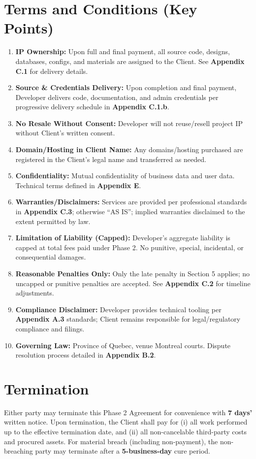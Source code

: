 \documentclass[11pt, a4paper]{article}
\begin{document}
\section{Terms and Conditions (Key Points)}
\begin{enumerate}[label=\textbf{8.\arabic*}, leftmargin=*, wide, labelwidth=!, labelindent=0pt]
  \item \textbf{IP Ownership:} Upon full and final payment, all source code, designs, databases, configs, and materials are assigned to the Client. See \textbf{Appendix C.1} for delivery details.
  \item \textbf{Source \& Credentials Delivery:} Upon completion and final payment, Developer delivers code, documentation, and admin credentials per progressive delivery schedule in \textbf{Appendix C.1.b}.
  \item \textbf{No Resale Without Consent:} Developer will not reuse/resell project IP without Client's written consent.
  \item \textbf{Domain/Hosting in Client Name:} Any domains/hosting purchased are registered in the Client's legal name and transferred as needed.
  \item \textbf{Confidentiality:} Mutual confidentiality of business data and user data. Technical terms defined in \textbf{Appendix E}.
  \item \textbf{Warranties/Disclaimers:} Services are provided per professional standards in \textbf{Appendix C.3}; otherwise ``AS IS''; implied warranties disclaimed to the extent permitted by law.
  \item \textbf{Limitation of Liability (Capped):} Developer's aggregate liability is capped at total fees paid under Phase 2. No punitive, special, incidental, or consequential damages.
  \item \textbf{Reasonable Penalties Only:} Only the late penalty in Section 5 applies; no uncapped or punitive penalties are accepted. See \textbf{Appendix C.2} for timeline adjustments.
  \item \textbf{Compliance Disclaimer:} Developer provides technical tooling per \textbf{Appendix A.3} standards; Client remains responsible for legal/regulatory compliance and filings.
  \item \textbf{Governing Law:} Province of Quebec, venue Montreal courts. Dispute resolution process detailed in \textbf{Appendix B.2}.
\end{enumerate}

\section{Termination}
Either party may terminate this Phase 2 Agreement for convenience with \textbf{7 days'} written notice. Upon termination, the Client shall pay for (i) all work performed up to the effective termination date, and (ii) all non-cancelable third-party costs and procured assets. For material breach (including non-payment), the non-breaching party may terminate after a \textbf{5-business-day} cure period.
\end{document}
